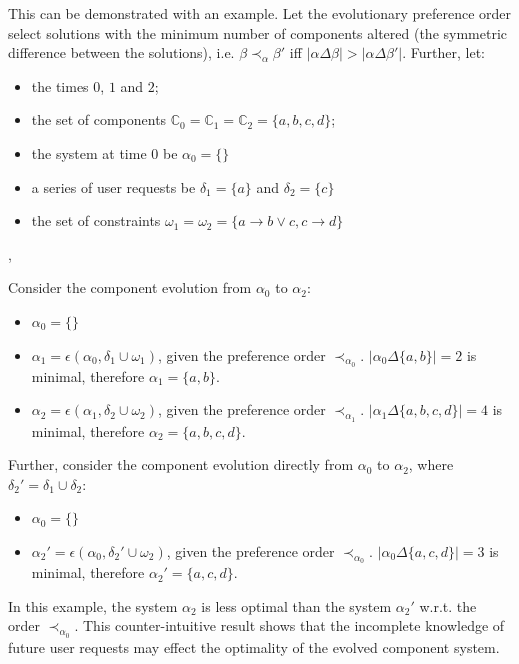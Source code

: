 This can be demonstrated with an example.
Let the evolutionary preference order select solutions with the minimum number of components altered (the symmetric difference between the solutions), 
i.e. $\beta \prec_{\alpha} \beta'$ iff $|\alpha \Delta \beta| > |\alpha \Delta \beta'|$.
Further, let:
\begin{itemize}
  \item the times $0$, $1$ and $2$;
  \item the set of components $\mathbb{C}_0 = \mathbb{C}_1 = \mathbb{C}_2 = \{a,b,c,d\}$;
  \item the system at time $0$ be $\alpha_0 = \{\}$
  \item a series of user requests be $\delta_1 = \{a\}$ and $ \delta_2 = \{c\}$
  \item the set of constraints $\omega_1 = \omega_2 = \{a \rightarrow b \vee c, c \rightarrow d\}$
\end{itemize}, 

Consider the component evolution from $\alpha_0$ to $\alpha_2$:
\begin{itemize}
  \item $\alpha_0 = \{\}$
  \item $\alpha_1 = \epsilon(\alpha_0,\delta_1 \cup \omega_1)$, given the preference order $\prec_{\alpha_0}$. $|\alpha_0 \Delta \{a,b\}| = 2$ is minimal, therefore $\alpha_1 = \{a,b\}$.
  \item $\alpha_2 = \epsilon(\alpha_1,\delta_2 \cup \omega_2)$, given the preference order $\prec_{\alpha_1}$. $|\alpha_1 \Delta \{a,b,c,d\}| = 4$ is minimal, therefore $\alpha_2 = \{a,b,c,d\}$.
\end{itemize}

Further, consider the component evolution directly from $\alpha_0$ to $\alpha_2$, where $\delta_2' = \delta_1 \cup \delta_2$:
\begin{itemize}
  \item $\alpha_0 = \{\}$
  \item $\alpha_2' = \epsilon(\alpha_0,\delta_2' \cup \omega_2)$, given the preference order $\prec_{\alpha_0}$. $|\alpha_0 \Delta \{a,c,d\}| = 3$ is minimal, therefore $\alpha_2' = \{a,c,d\}$.
\end{itemize}

In this example, the system $\alpha_2$ is less optimal than the system $\alpha_2'$ w.r.t. the order $\prec_{\alpha_0}$.
This counter-intuitive result shows that the incomplete knowledge of future user requests may effect the optimality of the evolved component system.


